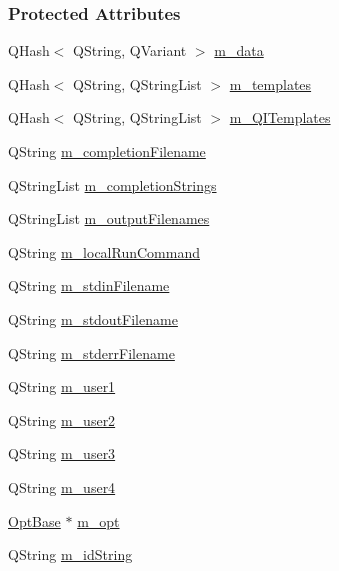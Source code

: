 \subsubsection*{Protected Attributes}
\begin{DoxyCompactItemize}
\item 
Q\+Hash$<$ Q\+String, Q\+Variant $>$ \hyperlink{classGlobalSearch_1_1Optimizer_a5cf732e34a6eaa4a7b1781d23e6e1c6e}{m\+\_\+data}
\item 
Q\+Hash$<$ Q\+String, Q\+String\+List $>$ \hyperlink{classGlobalSearch_1_1Optimizer_aa5892c64826b7cc7a2baa092efc8c66d}{m\+\_\+templates}
\item 
Q\+Hash$<$ Q\+String, Q\+String\+List $>$ \hyperlink{classGlobalSearch_1_1Optimizer_ac23d5114bf09b816666351868d49d1f8}{m\+\_\+\+Q\+I\+Templates}
\item 
Q\+String \hyperlink{classGlobalSearch_1_1Optimizer_a5e7a476823bc2d4b63939a9ada4f8ed0}{m\+\_\+completion\+Filename}
\item 
Q\+String\+List \hyperlink{classGlobalSearch_1_1Optimizer_a65ee33ee8778c366e8b197e75ae8e674}{m\+\_\+completion\+Strings}
\item 
Q\+String\+List \hyperlink{classGlobalSearch_1_1Optimizer_a28a8bf74bf7bdf00d453890796574c7d}{m\+\_\+output\+Filenames}
\item 
Q\+String \hyperlink{classGlobalSearch_1_1Optimizer_a1cdb6b6c5e929e84c834ba93148fb31e}{m\+\_\+local\+Run\+Command}
\item 
Q\+String \hyperlink{classGlobalSearch_1_1Optimizer_aca91d12d7aecae052d6ab5ae158acec6}{m\+\_\+stdin\+Filename}
\item 
Q\+String \hyperlink{classGlobalSearch_1_1Optimizer_a5ed04fdd5f8b511249e408adcd174550}{m\+\_\+stdout\+Filename}
\item 
Q\+String \hyperlink{classGlobalSearch_1_1Optimizer_a75b800a7f90a03d551f6795404d0c8f1}{m\+\_\+stderr\+Filename}
\item 
Q\+String \hyperlink{classGlobalSearch_1_1Optimizer_ae300aaecb74a7a61a501e4b8bd988957}{m\+\_\+user1}
\item 
Q\+String \hyperlink{classGlobalSearch_1_1Optimizer_a5ca1294d2a3aa119dfab655dfa270d3a}{m\+\_\+user2}
\item 
Q\+String \hyperlink{classGlobalSearch_1_1Optimizer_a279ca8ed61d6ca36f70c5c69b4d57397}{m\+\_\+user3}
\item 
Q\+String \hyperlink{classGlobalSearch_1_1Optimizer_aefab51b84978d2fb49eaf3585894808a}{m\+\_\+user4}
\item 
\hyperlink{classGlobalSearch_1_1OptBase}{Opt\+Base} $\ast$ \hyperlink{classGlobalSearch_1_1Optimizer_a689df6e2c0d8bbfff99585ca54199696}{m\+\_\+opt}
\item 
Q\+String \hyperlink{classGlobalSearch_1_1Optimizer_a4d2dc8b7aaa3bb6fed8c28547460def8}{m\+\_\+id\+String}
\end{DoxyCompactItemize}
